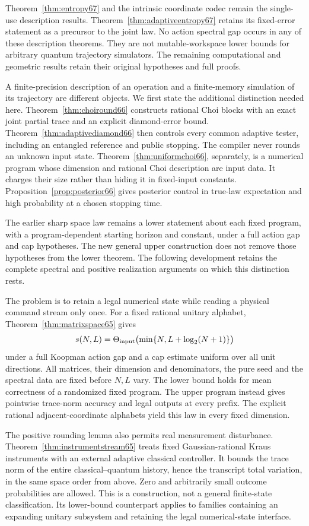 Theorem~\ref{thm:entropy67} and the intrinsic coordinate codec remain
the single-use description results. Theorem~\ref{thm:adaptiveentropy67}
retains its fixed-error statement as a precursor to the joint law.
No action spectral gap occurs in any of these description theorems.
They are not mutable-workspace lower bounds for arbitrary quantum
trajectory simulators. The remaining computational and geometric
results retain their original hypotheses and full proofs.

A finite-precision description of an operation and a finite-memory
simulation of its trajectory are different objects. We first state the
additional distinction needed here. Theorem~\ref{thm:choiround66}
constructs rational Choi blocks with an exact joint partial trace and
an explicit diamond-error bound. Theorem~\ref{thm:adaptivediamond66}
then controls every common adaptive tester, including an entangled
reference and public stopping. The compiler never rounds an unknown
input state. Theorem~\ref{thm:uniformchoi66}, separately, is a numerical
program whose dimension and rational Choi description are input data.
It charges their size rather than hiding it in fixed-input constants.
Proposition~\ref{prop:posterior66} gives posterior control in true-law
expectation and high probability at a chosen stopping time.

The earlier sharp space law remains a lower statement about each fixed
program, with a program-dependent starting horizon and constant,
under a full action gap and cap hypotheses. The new general upper
construction does not remove those hypotheses from the lower theorem.
The following development retains the complete spectral and positive
realization arguments on which this distinction rests.


The problem is to retain a legal numerical state while reading a
physical command stream only once. For a fixed rational unitary
alphabet, Theorem~\ref{thm:matrixspace65} gives
\[
 s(N,L)=\Theta_{\rm input}\bigl(\min\{N,L+\log_2(N+1)\}\bigr)
\]
under a full Koopman action gap and a cap estimate uniform over
all unit directions. All matrices, their dimension and denominators,
the pure seed and the spectral data are fixed before $N,L$ vary.
The lower bound holds for mean correctness of a randomized fixed
program. The upper program instead gives pointwise trace-norm
accuracy and legal outputs at every prefix. The explicit rational
adjacent-coordinate alphabets yield this law in every fixed dimension.

The positive rounding lemma also permits real measurement disturbance.
Theorem~\ref{thm:instrumentstream65} treats fixed Gaussian-rational
Kraus instruments with an external adaptive classical controller.
It bounds the trace norm of the entire classical--quantum history,
hence the transcript total variation, in the same space order from
above. Zero and arbitrarily small outcome probabilities are allowed.
This is a construction, not a general finite-state classification.
Its lower-bound counterpart applies to families containing an
expanding unitary subsystem and retaining the legal numerical-state
interface.

